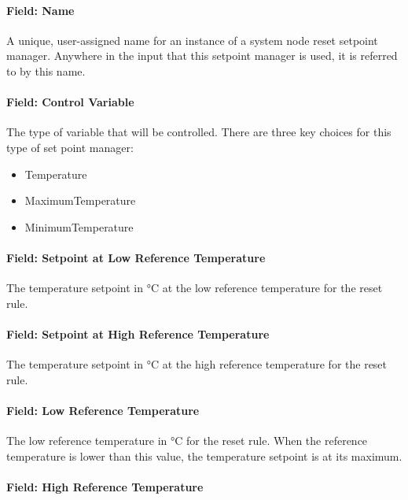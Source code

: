 \paragraph{Field: Name}

A unique, user-assigned name for an instance of a system node reset setpoint manager. Anywhere in the input that this setpoint manager is used, it is referred to by this name.

\paragraph{Field: Control Variable}

The type of variable that will be controlled. There are three key choices for this type of set point manager:
\begin{itemize}
  \item Temperature
  \item MaximumTemperature
  \item MinimumTemperature
\end{itemize}

\paragraph{Field: Setpoint at Low Reference Temperature}\label{field-setpoint-at-low-reference-temperature}

The temperature setpoint in \si{\degreeCelsius} at the low reference temperature for the reset rule.

\paragraph{Field: Setpoint at High Reference Temperature}\label{field-setpoint-at-high-reference-temperature}

The temperature setpoint in \si{\degreeCelsius} at the high reference temperature for the reset rule.

\paragraph{Field: Low Reference Temperature}\label{field-low-reference-temperature}

The low reference temperature in \si{\degreeCelsius} for the reset rule. When the reference temperature is lower than this value, the temperature setpoint is at its maximum.

\paragraph{Field: High Reference Temperature}\label{field-high-reference-temperature}

